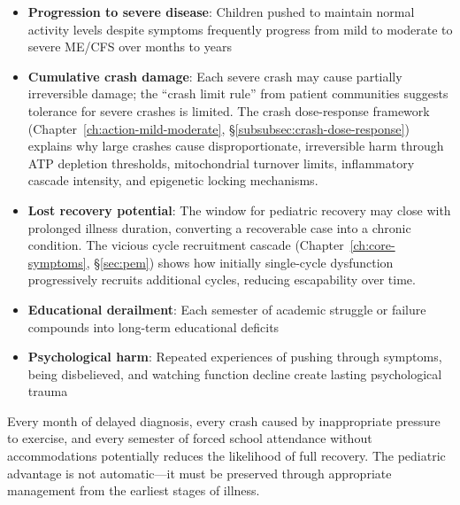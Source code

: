 \begin{itemize}
    \item \textbf{Progression to severe disease}: Children pushed to maintain normal activity levels despite symptoms frequently progress from mild to moderate to severe ME/CFS over months to years
    \item \textbf{Cumulative crash damage}: Each severe crash may cause partially irreversible damage; the ``crash limit rule'' from patient communities suggests tolerance for severe crashes is limited. The crash dose-response framework (Chapter~\ref{ch:action-mild-moderate}, \S\ref{subsubsec:crash-dose-response}) explains why large crashes cause disproportionate, irreversible harm through ATP depletion thresholds, mitochondrial turnover limits, inflammatory cascade intensity, and epigenetic locking mechanisms.
    \item \textbf{Lost recovery potential}: The window for pediatric recovery may close with prolonged illness duration, converting a recoverable case into a chronic condition. The vicious cycle recruitment cascade (Chapter~\ref{ch:core-symptoms}, \S\ref{sec:pem}) shows how initially single-cycle dysfunction progressively recruits additional cycles, reducing escapability over time.
    \item \textbf{Educational derailment}: Each semester of academic struggle or failure compounds into long-term educational deficits
    \item \textbf{Psychological harm}: Repeated experiences of pushing through symptoms, being disbelieved, and watching function decline create lasting psychological trauma
\end{itemize}

\begin{keypoint}
Every month of delayed diagnosis, every crash caused by inappropriate pressure to exercise, and every semester of forced school attendance without accommodations potentially reduces the likelihood of full recovery. The pediatric advantage is not automatic---it must be preserved through appropriate management from the earliest stages of illness.
\end{keypoint}

